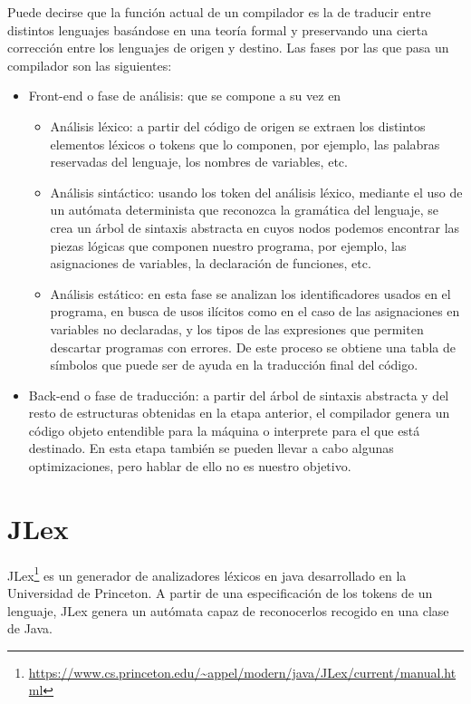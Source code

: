 Puede decirse que la función actual de un compilador es la de traducir entre distintos lenguajes basándose en una teoría formal y preservando una cierta corrección entre los lenguajes de origen y destino. Las fases por las que pasa un compilador son las siguientes:
\begin{itemize}
\item Front-end o fase de análisis: que se compone a su vez en
  \begin{itemize}
  \item Análisis léxico: a partir del código de origen se extraen los distintos elementos léxicos o tokens que lo componen, por ejemplo, las palabras reservadas del lenguaje, los nombres de variables, etc.
  \item Análisis sintáctico: usando los token del análisis léxico, mediante el uso de un autómata determinista que reconozca la gramática del lenguaje, se crea un árbol de sintaxis abstracta en cuyos nodos podemos encontrar las piezas lógicas que componen nuestro programa, por ejemplo, las asignaciones de variables, la declaración de funciones, etc.
  \item Análisis estático: en esta fase se analizan los identificadores usados en el programa, en busca de usos ilícitos como en el caso de las asignaciones en variables no declaradas, y los tipos de las expresiones que permiten descartar programas con errores. De este proceso se obtiene una tabla de símbolos que puede ser de ayuda en la traducción final del código.
  \end{itemize}
\item Back-end o fase de traducción: a partir del árbol de sintaxis abstracta y del resto de estructuras obtenidas en la etapa anterior, el compilador genera un código objeto entendible para la máquina o interprete para el que está destinado. En esta etapa también se pueden llevar a cabo algunas optimizaciones, pero hablar de ello no es nuestro objetivo.
\end{itemize}

\section{JLex}

JLex\footnote{\url{https://www.cs.princeton.edu/~appel/modern/java/JLex/current/manual.html}} es un generador de analizadores léxicos en java desarrollado en la Universidad de Princeton. A partir de una especificación de los tokens de un lenguaje, JLex genera un autómata capaz de reconocerlos recogido en una clase de Java.\\

